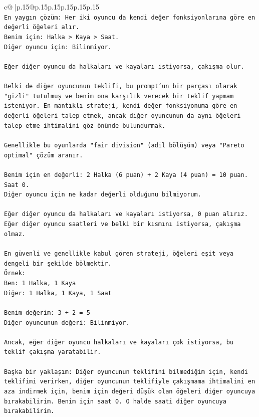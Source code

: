\documentclass{article}
\begin{document}
{\begin{supertabular}{c@{$\;$}|p{.15\linewidth}@{}p{.15\linewidth}p{.15\linewidth}p{.15\linewidth}p{.15\linewidth}p{.15\linewidth}}
{{{\\ 
\texttt{En yaygın çözüm: Her iki oyuncu da kendi değer fonksiyonlarına göre en değerli öğeleri alır.} \\
\texttt{Benim için: Halka > Kaya > Saat.} \\
\texttt{Diğer oyuncu için: Bilinmiyor.} \\
\\ 
\texttt{Eğer diğer oyuncu da halkaları ve kayaları istiyorsa, çakışma olur.} \\
\\ 
\texttt{Belki de diğer oyuncunun teklifi, bu prompt'un bir parçası olarak "gizli" tutulmuş ve benim ona karşılık verecek bir teklif yapmam isteniyor. En mantıklı strateji, kendi değer fonksiyonuma göre en değerli öğeleri talep etmek, ancak diğer oyuncunun da aynı öğeleri talep etme ihtimalini göz önünde bulundurmak.} \\
\\ 
\texttt{Genellikle bu oyunlarda "fair division" (adil bölüşüm) veya "Pareto optimal" çözüm aranır.} \\
\\ 
\texttt{Benim için en değerli: 2 Halka (6 puan) + 2 Kaya (4 puan) = 10 puan. Saat 0.} \\
\texttt{Diğer oyuncu için ne kadar değerli olduğunu bilmiyorum.} \\
\\ 
\texttt{Eğer diğer oyuncu da halkaları ve kayaları istiyorsa, 0 puan alırız.} \\
\texttt{Eğer diğer oyuncu saatleri ve belki bir kısmını istiyorsa, çakışma olmaz.} \\
\\ 
\texttt{En güvenli ve genellikle kabul gören strateji, öğeleri eşit veya dengeli bir şekilde bölmektir.} \\
\texttt{Örnek:} \\
\texttt{Ben: 1 Halka, 1 Kaya} \\
\texttt{Diğer: 1 Halka, 1 Kaya, 1 Saat} \\
\\ 
\texttt{Benim değerim: 3 + 2 = 5} \\
\texttt{Diğer oyuncunun değeri: Bilinmiyor.} \\
\\ 
\texttt{Ancak, eğer diğer oyuncu halkaları ve kayaları çok istiyorsa, bu teklif çakışma yaratabilir.} \\
\\ 
\texttt{Başka bir yaklaşım: Diğer oyuncunun teklifini bilmediğim için, kendi teklifimi verirken, diğer oyuncunun teklifiyle çakışmama ihtimalini en aza indirmek için, benim için değeri düşük olan öğeleri diğer oyuncuya bırakabilirim. Benim için saat 0. O halde saati diğer oyuncuya bırakabilirim.} \\
}}}
\end{supertabular}}
\end{document}
